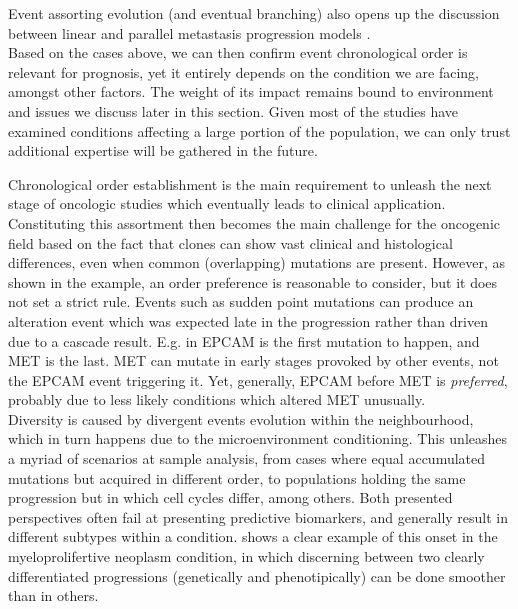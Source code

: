 Event assorting evolution (and eventual branching) also opens up the discussion between linear and parallel metastasis progression models \cite{Turajlic2016MetastasisProcess}.
\\

Based on the cases above, we can then confirm event chronological order is relevant for prognosis, yet it entirely depends on the condition we are facing, amongst other factors. The weight of its impact remains bound to environment and issues we discuss later in this section. Given most of the studies have examined conditions affecting a large portion of the population, we can only trust additional expertise will be gathered in the future.

Chronological order establishment is the main requirement to unleash the next stage  of oncologic studies which eventually leads to clinical application. Constituting this assortment then becomes the main challenge for the oncogenic field \cite{Gerstung2011TheTumorigenesis} based on the fact that clones can show vast clinical and histological differences, even when common (overlapping) mutations are present. However, as shown in the \cite{Fearon1990ATumorigenesis} example, an order preference is reasonable to consider, but it does not set a strict rule. Events such as sudden point mutations can produce an alteration event which was expected late in the progression rather than driven due to a cascade result. E.g. in \cite{Ascolani2019ModelingMatter} EPCAM is the first mutation to happen, and MET is the last. MET can mutate in early stages provoked by other events, not the EPCAM event triggering it. Yet, generally, EPCAM before MET is \emph{preferred}, probably due to less likely conditions which altered MET unusually.
\\

Diversity is caused by divergent events evolution within the neighbourhood, which in turn happens due to the microenvironment conditioning. This unleashes a myriad of scenarios at sample analysis, from cases where equal accumulated mutations but acquired in different order, to populations holding the same progression but in which cell cycles differ, among others. Both presented perspectives often fail at presenting predictive biomarkers, and generally result in different subtypes within a condition. \cite{Herbet2012AcquisitionPhenotypes} shows a clear example of this onset in the myeloprolifertive neoplasm condition, in which discerning between two clearly differentiated progressions (genetically and phenotipically) can be done smoother than in others.
\\

